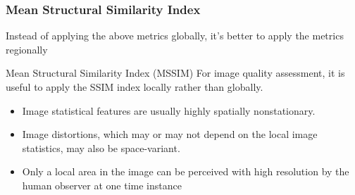 \documentclass[13.5pt,aspecratio=169, xcolor=dvipsnames]{beamer}
\begin{document}

\begin{frame}
    \onehalfspacing
        \frametitle{Mean Structural Similarity Index}
        
        Instead of applying the above metrics globally, it’s better to apply the metrics regionally
        \begin{block}{Mean Structural Similarity Index (MSSIM)}
            For image quality assessment, it is useful to apply the SSIM index locally rather than globally.
            \begin{itemize}
                \item Image statistical features are usually highly spatially nonstationary.
                \item Image distortions, which may or may not depend on the local image statistics, may also be space-variant.
                \item Only a local area in the image can be perceived with high resolution by the human observer at one time instance 
            \end{itemize}
        \end{block}
\end{frame}
    
\end{document}
